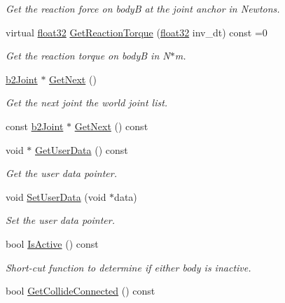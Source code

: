 \begin{DoxyCompactItemize}
\begin{DoxyCompactList}\small\item\em Get the reaction force on bodyB at the joint anchor in Newtons. \end{DoxyCompactList}\item 
virtual \mbox{\hyperlink{b2_settings_8h_aacdc525d6f7bddb3ae95d5c311bd06a1}{float32}} \mbox{\hyperlink{classb2_joint_ae355e441c2aa842777dc04e24f15ced0}{Get\+Reaction\+Torque}} (\mbox{\hyperlink{b2_settings_8h_aacdc525d6f7bddb3ae95d5c311bd06a1}{float32}} inv\+\_\+dt) const =0
\begin{DoxyCompactList}\small\item\em Get the reaction torque on bodyB in N$\ast$m. \end{DoxyCompactList}\item 
\mbox{\hyperlink{classb2_joint}{b2\+Joint}} $\ast$ \mbox{\hyperlink{classb2_joint_a1a0e2137b631010750c728cb4e276e5d}{Get\+Next}} ()
\begin{DoxyCompactList}\small\item\em Get the next joint the world joint list. \end{DoxyCompactList}\item 
const \mbox{\hyperlink{classb2_joint}{b2\+Joint}} $\ast$ \mbox{\hyperlink{classb2_joint_aac18301414d6ca0a20aefb471c709e78}{Get\+Next}} () const
\item 
void $\ast$ \mbox{\hyperlink{classb2_joint_a798c593c7a4958d408bca10f3b3788f9}{Get\+User\+Data}} () const
\begin{DoxyCompactList}\small\item\em Get the user data pointer. \end{DoxyCompactList}\item 
void \mbox{\hyperlink{classb2_joint_a492f2d02496437572aaec6013ebdc1c8}{Set\+User\+Data}} (void $\ast$data)
\begin{DoxyCompactList}\small\item\em Set the user data pointer. \end{DoxyCompactList}\item 
bool \mbox{\hyperlink{classb2_joint_ae9cfbd158216c9855c2f018ff3c9c922}{Is\+Active}} () const
\begin{DoxyCompactList}\small\item\em Short-\/cut function to determine if either body is inactive. \end{DoxyCompactList}\item 
bool \mbox{\hyperlink{classb2_joint_a48492903df96c8a7b8cad8ed826f8cb0}{Get\+Collide\+Connected}} () const

\end{DoxyCompactItemize}
